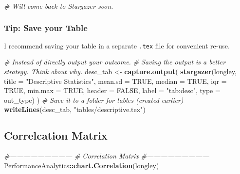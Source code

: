 \documentclass[11pt,]{article}
\newenvironment{Shaded}{\begin{snugshade}}{\end{snugshade}}
\newcommand{\KeywordTok}[1]{\textcolor[rgb]{0.13,0.29,0.53}{\textbf{#1}}}
\newcommand{\DataTypeTok}[1]{\textcolor[rgb]{0.13,0.29,0.53}{#1}}
\newcommand{\StringTok}[1]{\textcolor[rgb]{0.31,0.60,0.02}{#1}}
\newcommand{\CommentTok}[1]{\textcolor[rgb]{0.56,0.35,0.01}{\textit{#1}}}
\newcommand{\OtherTok}[1]{\textcolor[rgb]{0.56,0.35,0.01}{#1}}
\newcommand{\OperatorTok}[1]{\textcolor[rgb]{0.81,0.36,0.00}{\textbf{#1}}}
\newcommand{\NormalTok}[1]{#1}
\begin{document}
\begin{Shaded}
\begin{Highlighting}[]
    \CommentTok{# Will come back to Stargazer soon.}
\end{Highlighting}
\end{Shaded}

\normalsize

\subsubsection{Tip: Save your Table}\label{tip-save-your-table}

I recommend saving your table in a separate \texttt{.tex} file for
convenient re-use. \tiny

\begin{Shaded}
\begin{Highlighting}[]
  \CommentTok{# Instead of directly output your outcome. }
  \CommentTok{# Saving the output is a better strategy. Think about why.}
\NormalTok{  desc_tab <-}\StringTok{ }\KeywordTok{capture.output}\NormalTok{(}
    \KeywordTok{stargazer}\NormalTok{(longley, }\DataTypeTok{title =} \StringTok{"Descriptive Statistics"}\NormalTok{,}
        \DataTypeTok{mean.sd =} \OtherTok{TRUE}\NormalTok{, }\DataTypeTok{median =} \OtherTok{TRUE}\NormalTok{, }\DataTypeTok{iqr =} \OtherTok{TRUE}\NormalTok{, }\DataTypeTok{min.max =} \OtherTok{TRUE}\NormalTok{,}
        \DataTypeTok{header =} \OtherTok{FALSE}\NormalTok{, }\DataTypeTok{label =} \StringTok{"tab:desc"}\NormalTok{, }\DataTypeTok{type =}\NormalTok{ out_type)}
\NormalTok{    )}
  \CommentTok{# Save it to a folder for tables (created earlier)}
  \KeywordTok{writeLines}\NormalTok{(desc_tab, }\StringTok{"tables/descriptive.tex"}\NormalTok{)    }
\end{Highlighting}
\end{Shaded}

\normalsize



\clearpage

\subsection{Correlcation Matrix}\label{correlcation-matrix}

\tiny

\begin{Shaded}
\begin{Highlighting}[]
\CommentTok{#---------------------------}
\CommentTok{# Correlation Matrix}
\CommentTok{#---------------------------}
\NormalTok{  PerformanceAnalytics}\OperatorTok{::}\KeywordTok{chart.Correlation}\NormalTok{(longley)}
\end{Highlighting}
\end{Shaded}
\end{document}
